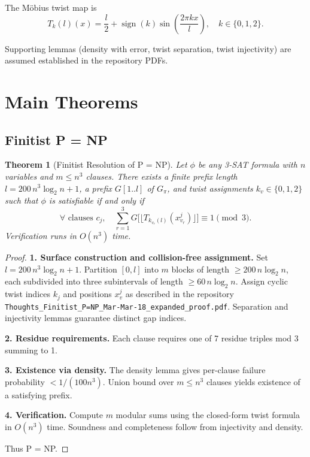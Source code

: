 \documentclass[11pt]{article}
\newtheorem{theorem}{Theorem}[section]
\begin{document}
The Möbius twist map is
\[
T_k(l)(x) = \frac{l}{2} + \operatorname{sign}(k) \sin\left( \frac{2\pi k x}{l} \right), \quad k\in\{0,1,2\}.
\]

Supporting lemmas (density with error, twist separation, twist injectivity) are assumed established in the repository PDFs.

\section{Main Theorems}

\subsection{Finitist P = NP}

\begin{theorem}[Finitist Resolution of P = NP]
Let $\phi$ be any 3-SAT formula with $n$ variables and $m \le n^3$ clauses. There exists a finite prefix length $l = 200\, n^3 \log_2 n + 1$, a prefix $G[1..l]$ of $G_\pi$, and twist assignments $k_v \in \{0,1,2\}$ such that $\phi$ is satisfiable if and only if
\[
\forall \text{ clauses } c_j, \quad \sum_{r=1}^3 G\bigl[\lfloor T_{k_{v_r}(l)}(x_{v_r}^j) \rfloor\bigr] \equiv 1 \pmod{3}.
\]
Verification runs in $O(n^3)$ time.
\end{theorem}

\begin{proof}
\textbf{1. Surface construction and collision-free assignment.}  
Set $l = 200\, n^3 \log_2 n + 1$. Partition $[0,l]$ into $m$ blocks of length $\ge 200\, n \log_2 n$, each subdivided into three subintervals of length $\ge 60\, n \log_2 n$. Assign cyclic twist indices $k_j$ and positions $x_v^j$ as described in the repository \texttt{Thoughts_Finitist_P=NP_Mar-Mar-18_expanded_proof.pdf}. Separation and injectivity lemmas guarantee distinct gap indices.

\textbf{2. Residue requirements.}  
Each clause requires one of 7 residue triples mod 3 summing to 1.

\textbf{3. Existence via density.}  
The density lemma gives per-clause failure probability $< 1/(100 n^3)$. Union bound over $m\le n^3$ clauses yields existence of a satisfying prefix.

\textbf{4. Verification.}  
Compute $m$ modular sums using the closed-form twist formula in $O(n^3)$ time. Soundness and completeness follow from injectivity and density.

Thus P = NP.
\end{proof}
\end{document}
